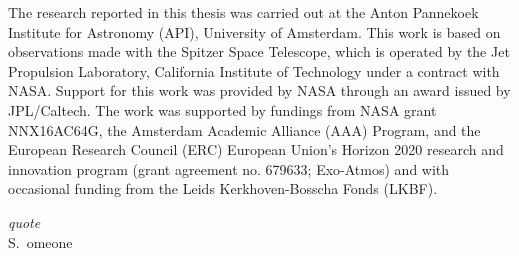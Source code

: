 {\small The research reported in this thesis was carried out at the Anton Pannekoek Institute for Astronomy (API), University of Amsterdam.
This work is based on observations made with the Spitzer Space Telescope, which is operated by the Jet Propulsion Laboratory, California Institute of Technology under a contract with NASA. Support for this work was provided by NASA through an award issued by JPL/Caltech.
The work was supported by fundings from NASA grant NNX16AC64G, the Amsterdam Academic Alliance (AAA) Program, and the European Research Council (ERC) European Union’s Horizon 2020 research and innovation program (grant agreement no. 679633; Exo-Atmos) and with occasional funding from the Leids Kerkhoven-Bosscha Fonds (LKBF).} \vspace{0.5em}

\clearpage

\thispagestyle{empty}
\null\vfill\null
\hfill\parbox{110mm}{
  \raggedleft
    \emph{\large quote}\\[5pt]
  S.~omeone
}
\null\vfill\null
\clearpage
\thispagestyle{empty}
\newpage
\phantom{let's kill those trees}

\pagestyle{fancy}
\setlength\parindent{15pt}


